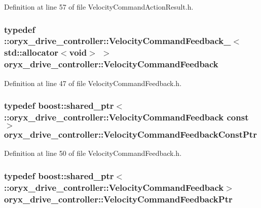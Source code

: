 \-Definition at line 57 of file \-Velocity\-Command\-Action\-Result.\-h.

\subsubsection[{\-Velocity\-Command\-Feedback}]{\setlength{\rightskip}{0pt plus 5cm}typedef \-::{\bf oryx\-\_\-drive\-\_\-controller\-::\-Velocity\-Command\-Feedback\-\_\-}$<$std\-::allocator$<$void$>$ $>$ {\bf oryx\-\_\-drive\-\_\-controller\-::\-Velocity\-Command\-Feedback}}\label{namespaceoryx__drive__controller_a88228f83704851bc3dedf2edeec0d9c4}


\-Definition at line 47 of file \-Velocity\-Command\-Feedback.\-h.

\subsubsection[{\-Velocity\-Command\-Feedback\-Const\-Ptr}]{\setlength{\rightskip}{0pt plus 5cm}typedef boost\-::shared\-\_\-ptr$<$ \-::{\bf oryx\-\_\-drive\-\_\-controller\-::\-Velocity\-Command\-Feedback} const$>$ {\bf oryx\-\_\-drive\-\_\-controller\-::\-Velocity\-Command\-Feedback\-Const\-Ptr}}\label{namespaceoryx__drive__controller_aa23338c67fe55b8014e2f02be59c7af5}


\-Definition at line 50 of file \-Velocity\-Command\-Feedback.\-h.

\subsubsection[{\-Velocity\-Command\-Feedback\-Ptr}]{\setlength{\rightskip}{0pt plus 5cm}typedef boost\-::shared\-\_\-ptr$<$ \-::{\bf oryx\-\_\-drive\-\_\-controller\-::\-Velocity\-Command\-Feedback}$>$ {\bf oryx\-\_\-drive\-\_\-controller\-::\-Velocity\-Command\-Feedback\-Ptr}}\label{namespaceoryx__drive__controller_ad9fd9b303beacd6a8f3e0f1845c63e23}



